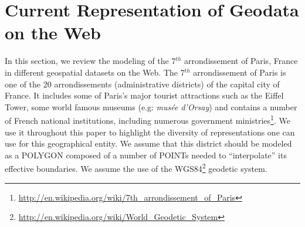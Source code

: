 \section{Current Representation of Geodata on the Web}\label{sec:scenario}
In this section, we review the modeling of the 7$^{th}$ arrondissement of Paris, France in different geospatial datasets on the Web. The 7$^{th}$ arrondissement of Paris is one of the 20 arrondissements (administrative districts) of the capital city of France. It includes some of Paris's major tourist attractions such as the Eiffel Tower, some world famous museums (e.g: \textit{mus\'{e}e d'Orsay}) and contains a number of French national institutions, including numerous government ministries\footnote{\url{http://en.wikipedia.org/wiki/7th_arrondissement_of_Paris}}. We use it throughout this paper to highlight the diversity of representations one can use for this geographical entity. We assume that this district should be modeled as a POLYGON composed of a number of POINTs needed to ``interpolate'' its effective boundaries. We assume the use of the WGS84\footnote{\url{http://en.wikipedia.org/wiki/World_Geodetic_System}} geodetic system.

\begin{table}[!htbp]
\end{table}

